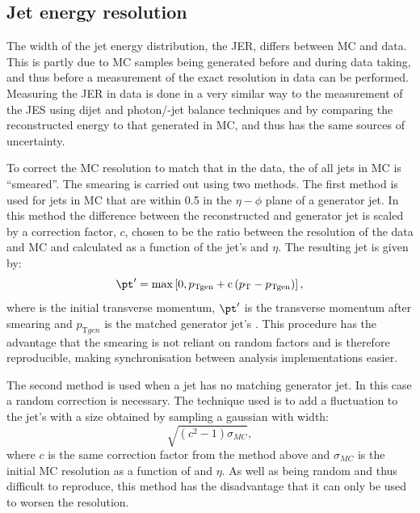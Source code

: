 \subsection{Jet energy resolution}
\label{sec:promptjer}
The width of the jet energy distribution, the \ac{JER}, differs between \ac{MC} and data. This is partly due to \ac{MC} samples being generated before and during data taking, and thus before a measurement of the exact resolution in data can be performed. Measuring the \ac{JER} in data is done in a very similar way to the measurement of the \ac{JES} using dijet and photon/\PZ-jet balance techniques and by comparing the reconstructed energy to that generated in \ac{MC}, and thus has the same sources of uncertainty.

To correct the \ac{MC} resolution to match that in the data, the \pt of all jets in \ac{MC} is ``smeared''. The smearing is carried out using two methods. The first method is used for jets in \ac{MC} that are within 0.5 in the $\eta-\phi$ plane of a generator jet. In this method the difference between the reconstructed and generator jet \pt is scaled by a correction factor, $c$, chosen to be the ratio between the resolution of the data and \ac{MC} and calculated as a function of the jet's \pt and $\eta$. The resulting jet \pt is given by:
\begin{equation}
  \label{eq:promptjermatched}
  \pt'=\rm{max}\left[0,\mathnormal{p}_{{\mathrm{T}}gen}+c\left(\mathnormal{p}_{\mathrm{T}}-\mathnormal{p}_{{\mathrm{T}}gen}\right)\right],
\end{equation}
where \pt is the initial transverse momentum, $\pt'$ is the transverse momentum after smearing and $p_{\mathrm{T}gen}$ is the matched generator jet's \pt. This procedure has the advantage that the smearing is not reliant on random factors and is therefore reproducible, making synchronisation between analysis implementations easier.

The second method is used when a jet has no matching generator jet. In this case a random correction is necessary. The technique used is to add a fluctuation to the jet's \pt with a size obtained by sampling a gaussian with width:
\begin{equation}
  \label{eq:promptjerunmatched}
  \sqrt{\left(c^{2}-1\right)\sigma_{MC}},
\end{equation}
where $c$ is the same correction factor from the method above and $\sigma_{MC}$ is the initial \ac{MC} resolution as a function of \pt and $\eta$. As well as being random and thus difficult to reproduce, this method has the disadvantage that it can only be used to worsen the resolution. 

